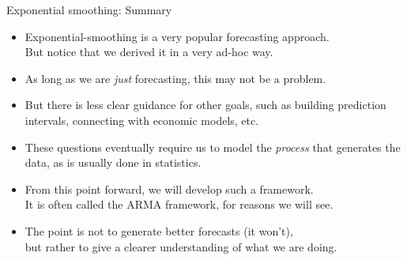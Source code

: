 \documentclass[t,12pt]{beamer}
\begin{document}
	\begin{frame}[c]{Exponential smoothing: Summary}
	\begin{itemize}
	\item
	Exponential-smoothing is a very popular forecasting approach.
	\\ But notice that we derived it in a very ad-hoc way.
	\smallskip
	\item
	As long as we are \emph{just} forecasting, this may not be a problem.
	\smallskip
	\item
	But there is less clear guidance for other goals, such as building prediction intervals, connecting with economic models, etc.
	\smallskip
	\item
	These questions eventually require us to model the \emph{process} that generates the data, as is usually done in statistics.
	\smallskip
	\item
	From this point forward, we will develop such a framework.
	\\ It is often called the ARMA framework, for reasons we will see.
	\smallskip
	\item
	The point is not to generate better forecasts (it won't), 
	\\ but rather to give a clearer understanding of what we are doing.
	\end{itemize}
	\end{frame}
\end{document}
